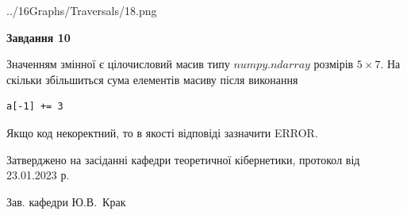 \documentclass[12pt, ukrainian]{article}
\begin{document}
{\begin {large}
\begin{center}
	{../16Graphs/Traversals/18.png}
\end{center}\par
\newpage

{\begin {center}\textbf{Завдання 10}\end {center}}\par
Значенням змінної  є цілочисловий масив типу $numpy.ndarray$ розмірів $5{\times}7$. На скільки збільшиться сума елементів масиву  після виконання
\begin{verbatim}
a[-1] += 3
\end{verbatim}


Якщо код некоректний, то в якості відповіді зазначити ERROR.\par
\newpage


\end {large}
}
{\smallskip \begin {small} Затверджено на засіданні кафедри теоретичної кібернетики, протокол  від   23.01.2023 р.\par\smallskip\smallskip
{\parbox {6.5 cm}{Зав. кафедри \dotfill Ю.В.~Крак}} \end{small}}
\end{document}
